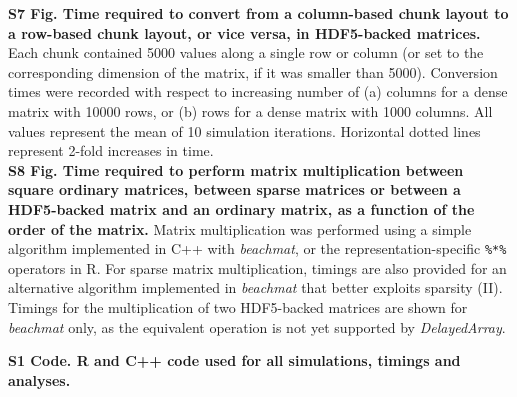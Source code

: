 \documentclass[10pt,letterpaper]{article}
\newcommand{\beachmat}{\textit{beachmat}}
\newcommand{\code}[1]{\texttt{#1}}
\begin{document}
\noindent
\textbf{S7 Fig. Time required to convert from a column-based chunk layout to a row-based chunk layout, or vice versa, in HDF5-backed matrices.}
Each chunk contained 5000 values along a single row or column (or set to the corresponding dimension of the matrix, if it was smaller than 5000).
Conversion times were recorded with respect to increasing number of (a) columns for a dense matrix with 10000 rows, or (b) rows for a dense matrix with 1000 columns.
All values represent the mean of 10 simulation iterations.
Horizontal dotted lines represent 2-fold increases in time.
\\[0.05in]

\noindent
\textbf{S8 Fig. Time required to perform matrix multiplication between square ordinary matrices, between sparse matrices or between a HDF5-backed matrix and an ordinary matrix,
as a function of the order of the matrix.}    
Matrix multiplication was performed using a simple algorithm implemented in C++ with \beachmat{}, or the representation-specific \code{\%*\%} operators in R.
For sparse matrix multiplication, timings are also provided for an alternative algorithm implemented in \beachmat{} that better exploits sparsity (II). 
Timings for the multiplication of two HDF5-backed matrices are shown for \beachmat{} only, as the equivalent operation is not yet supported by \textit{DelayedArray}.

\noindent
\textbf{S1 Code. R and C++ code used for all simulations, timings and analyses.}
\end{document}
